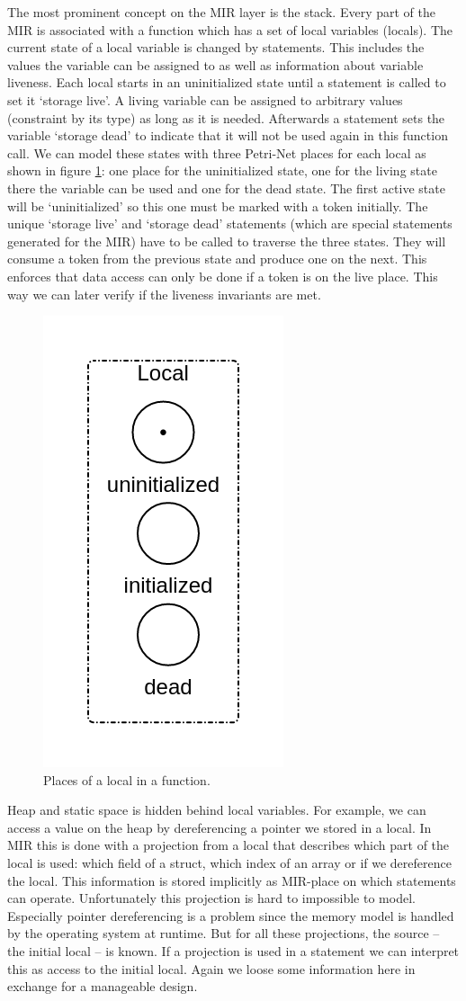 The most prominent concept on the MIR layer is the stack.
Every part of the MIR is associated with a function which has a set of local variables (locals).
The current state of a local variable is changed by statements.
This includes the values the variable can be assigned to as well as information about variable liveness.
Each local starts in an uninitialized state until a statement is called to set it `storage live'.
A living variable can be assigned to arbitrary values (constraint by its type) as long as it is needed.
Afterwards a statement sets the variable `storage dead' to indicate that it will not be used again in this function call.
We can model these states with three Petri-Net places for each local as shown in figure \ref{local}: one place for the uninitialized state, one for the living state there the variable can be used and one for the dead state.
The first active state will be `uninitialized' so this one must be marked with a token initially.
The unique `storage live' and `storage dead' statements (which are special statements generated for the MIR) have to be called to traverse the three states.
They will consume a token from the previous state and produce one on the next.
This enforces that data access can only be done if a token is on the live place.
This way we can later verify if the liveness invariants are met.
\begin{figure}
    \centering
    \includegraphics[width=.2\textwidth]{../diagrams/local.png}
    \caption{Places of a local in a function.}
    \label{local}
\end{figure}

Heap and static space is hidden behind local variables.
For example, we can access a value on the heap by dereferencing a pointer we stored in a local.
In MIR this is done with a projection from a local that describes which part of the local is used:
which field of a struct, which index of an array or if we dereference the local.
This information is stored implicitly as MIR-place on which statements can operate.
Unfortunately this projection is hard to impossible to model.
Especially pointer dereferencing is a problem since the memory model is handled by the operating system at runtime.
But for all these projections, the source -- the initial local -- is known.
If a projection is used in a statement we can interpret this as access to the initial local.
Again we loose some information here in exchange for a manageable design.

